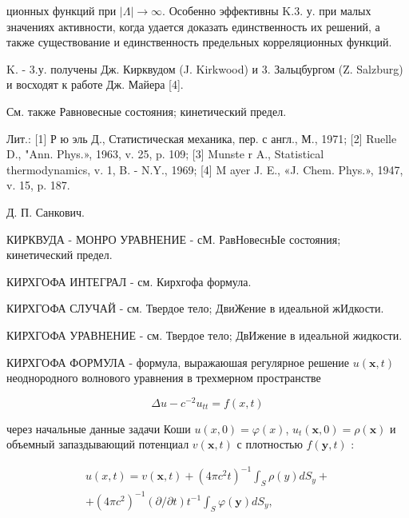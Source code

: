\documentclass[10pt]{article}
\begin{document}
ционных функций при $|\Lambda| \rightarrow \infty$. Особенно эффективны K.3. у. при малых значениях активности, когда удается доказать единственность их решений, а также существование и единственность предельных корреляционных функций.



K. - 3.у. получены Дж. Кирквудом (J. Kirkwood) и 3. Зальцбургом (Z. Salzburg) и восходят к работе Дж. Майера [4].



См. также Равновесные состояния; кинетический предел.



Лит.: [1] Р ю эль Д., Статистическая механика, пер. с англ., М., 1971; [2] Ruelle D., "Ann. Phys.», 1963, v. 25, p. 109; [3] Munste r A., Statistical thermodynamics, v. 1, B. - N.Y., 1969; [4] M ayer J. E., «J. Chem. Phys.», 1947, v. 15, p. 187.



Д. П. Санкович.



КИРКВУДА - МОНРО УРАВНЕНИЕ - сМ. РавНовеснЫе состояния; кинетический предел.



КИРХГОФА ИНТЕГРАЛ - см. Кирхгофа формула.



КИРХГОФА СЛУЧАЙ - см. Твердое тело; ДвиЖение в идеальной жИдкости.



КИРХГОФА УРАВНЕНИЕ - см. Твердое тело; ДвИжение в идеальной жидкости.



КИРХГОФА ФОРМУЛА - формула, выражаюшая регулярное решение $u(\boldsymbol{x}, t)$ неоднородного волнового уравнения в трехмерном пространстве



\[

\Delta u-c^{-2} u_{t t}=f(x, t)

\]



через начальные данные задачи Коши $u(x, 0)=\varphi(x)$, $u_{t}(\boldsymbol{x}, 0)=\rho(\boldsymbol{x})$ и объемный запаздывающий потенциал $v(\boldsymbol{x}, t)$ с плотностью $f(\boldsymbol{y}, t)$ :



\[

\begin{gathered}

u(x, t)=v(\boldsymbol{x}, t)+\left(4 \pi c^{2} t\right)^{-1} \int_{S} \rho(y) d S_{y}+ \\

+\left(4 \pi c^{2}\right)^{-1}(\partial / \partial t) t^{-1} \int_{S} \varphi(\boldsymbol{y}) d S_{y},

\end{gathered}

\]
\end{document}
